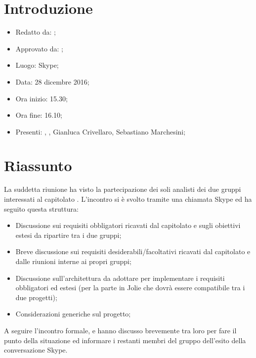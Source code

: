 \section{Introduzione}

	\begin{itemize}
		\item Redatto da: \MC;
		\item Approvato da: \AS;
		\item Luogo: Skype;
		\item Data: 28 dicembre 2016;
		\item Ora inizio: 15.30;
		\item Ora fine: 16.10;
		\item Presenti: \DAN, \MC, Gianluca Crivellaro, Sebastiano Marchesini;		
	\end{itemize}

\section{Riassunto}
La suddetta riunione ha visto la partecipazione dei soli analisti dei due gruppi interessati al capitolato \progetto. L'incontro si è svolto tramite una chiamata Skype ed ha seguito questa struttura:
\begin{itemize}
	\item Discussione sui requisiti obbligatori ricavati dal capitolato e sugli obiettivi estesi da ripartire tra i due gruppi;
	\item Breve discussione sui requisiti desiderabili/facoltativi ricavati dal capitolato e dalle riunioni interne ai propri gruppi;
	\item Discussione sull'architettura da adottare per implementare i requisiti obbligatori ed estesi (per la parte in Jolie che dovrà essere compatibile tra i due progetti);
	\item Considerazioni generiche sul progetto;
\end{itemize}
A seguire l'incontro formale, \DAN  e \MC  hanno discusso brevemente tra loro per fare il punto della situazione ed informare i restanti membri del gruppo dell'esito della conversazione Skype.
